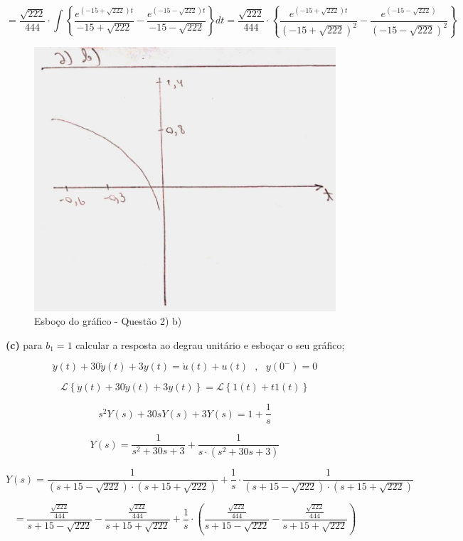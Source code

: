 \documentclass{article}
\begin{document}
\[ = \frac{\sqrt{222}}{444} \cdot \int \left\{ \frac{e^{(-15+\sqrt{222})t}}{-15+\sqrt{222}} - \frac{e^{(-15-\sqrt{222})t}}{-15-\sqrt{222}} \right\} dt = \frac{\sqrt{222}}{444} \cdot \left\{ \frac{e^{(-15+\sqrt{222})t}}{(-15+\sqrt{222})^{2}} - \frac{e^{(-15-\sqrt{222})}}{(-15-\sqrt{222})^{2}} \right\} \]

\begin{figure}[h]
    \includegraphics[scale=0.25]{Q2_b.png}
    \centering
    \caption{Esboço do gráfico - Questão 2) b)}
\end{figure}

\vspace{\baselineskip}

\textbf{(c)} para $b_1 = 1$ calcular a resposta ao degrau unitário e esboçar o seu gráfico;

\[\ddot{y}(t) + 30\dot{y}(t) + 3y(t) = \dot{u}(t) + u(t)\,\,\,\,,\,\,\,\,y(0^{-}) = 0\]

\[\mathcal{L} \left\{\ddot{y}(t) + 30\dot{y}(t) + 3y(t)\right\} = \mathcal{L} \left\{1(t) + t1(t)\right\}\]

\[ s^{2}Y(s) + 30sY(s) + 3Y(s) = 1 + \frac{1}{s} \]

\[Y(s) = \frac{1}{s^{2} + 30s + 3} + \frac{1}{s \cdot (s^{2} + 30s + 3)}\]

\[ Y(s) = \frac{1}{(s + 15 - \sqrt{222}) \cdot (s + 15 + \sqrt{222})} + \frac{1}{s} \cdot \frac{1}{(s + 15 - \sqrt{222}) \cdot (s + 15 + \sqrt{222})}\]

\[ = \frac{ \frac{\sqrt{222}}{444}}{s + 15 - \sqrt{222}} - \frac{\frac{\sqrt{222}}{444}}{s + 15 + \sqrt{222}} + \frac{1}{s} \cdot \left(\frac{ \frac{\sqrt{222}}{444}}{s + 15 - \sqrt{222}} - \frac{\frac{\sqrt{222}}{444}}{s + 15 + \sqrt{222}}\right) \]
\end{document}
